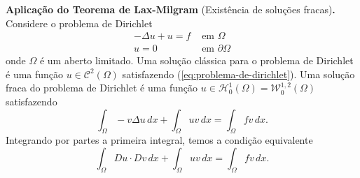 \documentclass[a4paper, 11pt]{book}
\theoremstyle{definition}
\newcommand{\cC}{\mathcal{C}}
\newcommand{\cH}{\mathcal{H}}
\newcommand{\cW}{\mathcal{W}}
\begin{document}
\noindent\textbf{Aplicação do Teorema de Lax-Milgram} (Existência de soluções fracas)\textbf{.} Considere o problema de Dirichlet
\begin{equation} \label{eq:problema-de-dirichlet}
    \begin{aligned}
        -\Delta u + u = f &\text{ em } \Omega\\
        u = 0 &\text{ em } \partial\Omega
    \end{aligned}
\end{equation}
onde $\Omega$ é um aberto limitado.
Uma solução clássica para o problema de Dirichlet é uma função $u  \in \cC^2(\Omega)$ satisfazendo (\ref{eq:problema-de-dirichlet}).
Uma solução fraca do problema de Dirichlet é uma função $u \in \cH_0^1(\Omega) = \cW^{1,2}_0(\Omega)$ satisfazendo
\[
    \int_\Omega -v \Delta u \, dx + \int_\Omega u v \, dx = \int_\Omega f v \, dx.
\]
Integrando por partes a primeira integral, temos a condição equivalente
\[
    \int_\Omega D u \cdot D v \, dx + \int_\Omega u v \, dx = \int_\Omega f v \, dx.
\]


\nocite{*}
\printbibliography
\end{document}
